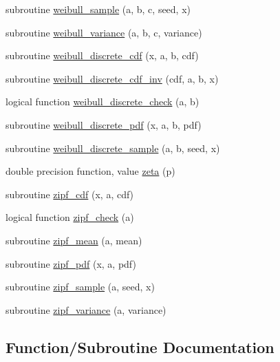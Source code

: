 \begin{DoxyCompactItemize}
\item 
subroutine \hyperlink{subroutines_8f_a9f7c934964fac585c5369f957382eab0}{weibull\+\_\+sample} (a, b, c, seed, x)
\item 
subroutine \hyperlink{subroutines_8f_a5c4e758650cdd5f1f407a932e1cde105}{weibull\+\_\+variance} (a, b, c, variance)
\item 
subroutine \hyperlink{subroutines_8f_ab34b5e8666ea41c5ab564c56a11e88f1}{weibull\+\_\+discrete\+\_\+cdf} (x, a, b, cdf)
\item 
subroutine \hyperlink{subroutines_8f_a1204dfb7e8bc98633fbe31061c370c85}{weibull\+\_\+discrete\+\_\+cdf\+\_\+inv} (cdf, a, b, x)
\item 
logical function \hyperlink{subroutines_8f_aa9fecd5de6c8f01d32d025cde7443dbb}{weibull\+\_\+discrete\+\_\+check} (a, b)
\item 
subroutine \hyperlink{subroutines_8f_a9550bf6e0d0c82862d6c811291ff9a53}{weibull\+\_\+discrete\+\_\+pdf} (x, a, b, pdf)
\item 
subroutine \hyperlink{subroutines_8f_a34a92d791e6c7276adcbe1cd6e9c366f}{weibull\+\_\+discrete\+\_\+sample} (a, b, seed, x)
\item 
double precision function, value \hyperlink{subroutines_8f_a2ad5727389a72db607052fa457bacf7b}{zeta} (p)
\item 
subroutine \hyperlink{subroutines_8f_ae8a401a7b095f2303a3025ec1a6080c1}{zipf\+\_\+cdf} (x, a, cdf)
\item 
logical function \hyperlink{subroutines_8f_aa599fb17c8b01fde08d9683d746266c6}{zipf\+\_\+check} (a)
\item 
subroutine \hyperlink{subroutines_8f_ab3bfbabacbc67bb7feff780328a4a26c}{zipf\+\_\+mean} (a, mean)
\item 
subroutine \hyperlink{subroutines_8f_ac57c48834bf4850b8278bd8af5bac9ad}{zipf\+\_\+pdf} (x, a, pdf)
\item 
subroutine \hyperlink{subroutines_8f_a5098279191de72d2fbd4a7457caaf060}{zipf\+\_\+sample} (a, seed, x)
\item 
subroutine \hyperlink{subroutines_8f_aaa5f46761caed5c5998401d0fbc17c58}{zipf\+\_\+variance} (a, variance)
\end{DoxyCompactItemize}


\subsection{Function/\+Subroutine Documentation}
